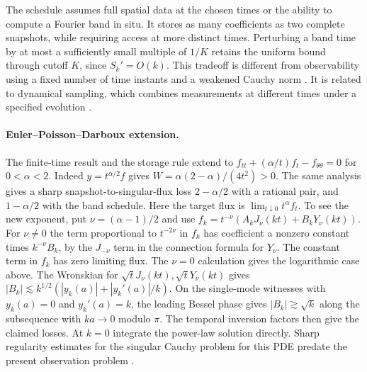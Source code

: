 \documentclass[11pt]{article}
\begin{document}
The schedule assumes full spatial data at the chosen times or
the ability to compute a Fourier band in situ. It stores as many
coefficients as two complete snapshots, while requiring access at
more distinct times. Perturbing a band time by at most a sufficiently
small multiple of $1/K$ retains the uniform bound through cutoff $K$,
since $S_k'=O(k)$. This tradeoff is different from observability
using a fixed number of time instants and a weakened Cauchy norm
\cite[Theorem 4.1]{vest}. It is related to dynamical sampling, which
combines measurements at different times under a specified evolution
\cite{aldroubi}.

\paragraph{Euler--Poisson--Darboux extension.}
The finite-time result and the storage rule extend to
$f_{tt}+(\alpha/t)f_t-f_{\theta\theta}=0$ for $0<\alpha<2$.
Indeed $y=t^{\alpha/2}f$ gives
$W=\alpha(2-\alpha)/(4t^2)>0$. The same analysis gives a sharp
snapshot-to-singular-flux loss $2-\alpha/2$ with a rational pair,
and $1-\alpha/2$ with the band schedule. Here the target flux is
$\lim_{t\downarrow0}t^\alpha f_t$.
To see the new exponent, put $\nu=(\alpha-1)/2$ and use
$f_k=t^{-\nu}(A_kJ_\nu(kt)+B_kY_\nu(kt))$.
For $\nu\ne0$ the term proportional to $t^{-2\nu}$ in $f_k$
has coefficient a nonzero constant times $k^{-\nu}B_k$, by the
$J_{-\nu}$ term in the connection formula for $Y_\nu$. The
constant term in $f_k$ has zero limiting flux. The $\nu=0$
calculation gives the logarithmic case above.
The Wronskian for $\sqrt tJ_\nu(kt),\sqrt tY_\nu(kt)$ gives
$|B_k|\lesssim k^{1/2}(|y_k(a)|+|y_k'(a)|/k)$. On the
single-mode witnesses with $y_k(a)=0$ and $y_k'(a)=k$, the
leading Bessel phase gives $|B_k|\gtrsim\sqrt k$ along the
subsequence with $ka\to0$ modulo $\pi$. The temporal inversion
factors then give the claimed losses. At $k=0$ integrate the
power-law solution directly. Sharp regularity estimates for
the singular Cauchy problem for this PDE predate the present
observation problem \cite{epd}.
\end{document}
